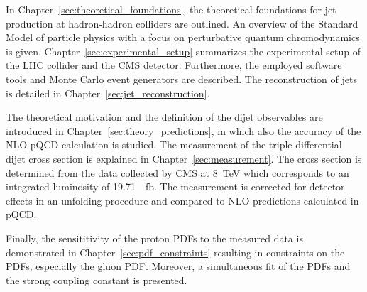 In Chapter~\ref{sec:theoretical_foundations}, the theoretical foundations for
jet production at hadron-hadron colliders are outlined. An overview of the
Standard Model of particle physics with a focus on perturbative quantum
chromodynamics is given. Chapter~\ref{sec:experimental_setup} summarizes the
experimental setup of the LHC collider and the CMS detector. Furthermore, the
employed software tools and Monte Carlo event generators are described. The
reconstruction of jets is detailed in Chapter~\ref{sec:jet_reconstruction}.

The theoretical motivation and the definition of the dijet observables are
introduced in Chapter~\ref{sec:theory_predictions}, in which also the accuracy
of the NLO pQCD calculation is studied. The measurement of the
triple-differential dijet cross section is explained in
Chapter~\ref{sec:measurement}. The cross section is determined from the data
collected by CMS at \SI{8}{\TeV} which corresponds to an integrated luminosity
of \SI{19.71}{\per \femto \barn}. The measurement is corrected for detector
effects in an unfolding procedure and compared to NLO predictions calculated in
pQCD.

Finally, the sensititivity of the proton PDFs to the measured data is
demonstrated in Chapter~\ref{sec:pdf_constraints} resulting in constraints on
the PDFs, especially the gluon PDF. Moreover, a simultaneous fit of the PDFs and
the strong coupling constant is presented.

